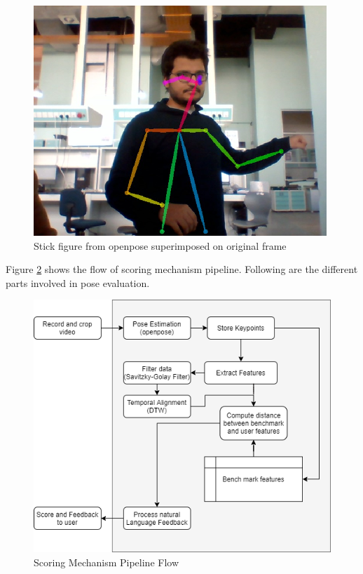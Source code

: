 \begin{figure}
    \centering
    \includegraphics[scale=.75]{images/sketeton.png}
    \caption{Stick figure from openpose superimposed on original frame}
    \label{fig:stickFigure}
\end{figure}

Figure \ref{fig:scoringPipeline} shows the flow of scoring mechanism pipeline. Following are the different parts involved in pose evaluation.

\begin{figure}
  \centering
  \includegraphics[scale=0.6]{images/scoringPipeline.png}
  \caption{Scoring Mechanism Pipeline Flow}
  \label{fig:scoringPipeline}
\end{figure}

